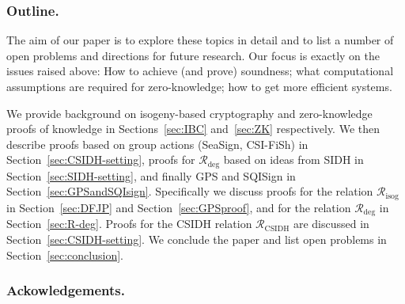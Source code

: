 \documentclass{llncs}
\newcommand{\R}[1][]{\ensuremath{\mathcal{R}_{\mathrm{#1}}}}
\newcommand{\comment}[1]{{\color{gray}#1}}
\newcommand{\CP}[1]{\comment{Christophe: #1}}
\begin{document}












\subsubsection{Outline.}

The aim of our paper is to explore these topics in detail and to list a number of open problems and directions for future research.
Our focus is exactly on the issues raised above: How to achieve (and prove) soundness; what computational assumptions are required for zero-knowledge; how to get more efficient systems.

We provide background on isogeny-based cryptography and zero-knowledge proofs of knowledge in Sections~\ref{sec:IBC} and~\ref{sec:ZK} respectively. 
%
We then describe proofs based on group actions (SeaSign, CSI-FiSh) in Section~\ref{sec:CSIDH-setting}, proofs for $\R[deg]$ based on ideas from SIDH in Section~\ref{sec:SIDH-setting}, and finally GPS and SQISign in Section~\ref{sec:GPSandSQIsign}.
%
Specifically we discuss proofs for the relation $ \R[isog] $ in Section~\ref{sec:DFJP} and Section~\ref{sec:GPSproof}, and for the relation $\R[deg]$ in Section~\ref{sec:R-deg}.
Proofs for the CSIDH relation $\R[CSIDH]$ are discussed in Section~\ref{sec:CSIDH-setting}.
%
We conclude the paper and list open problems in Section~\ref{sec:conclusion}.


\subsubsection{Ackowledgements.}
\end{document}
